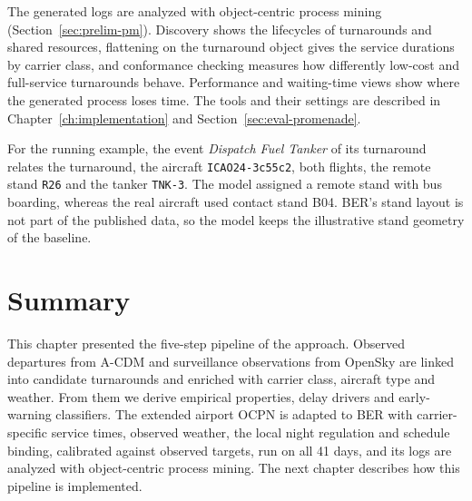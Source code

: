 The generated logs are analyzed with object-centric process mining (Section~\ref{sec:prelim-pm}). Discovery shows the lifecycles of turnarounds and shared resources, flattening on the turnaround object gives the service durations by carrier class, and conformance checking measures how differently low-cost and full-service turnarounds behave. Performance and waiting-time views show where the generated process loses time. The tools and their settings are described in Chapter~\ref{ch:implementation} and Section~\ref{sec:eval-promenade}.

For the running example, the event \emph{Dispatch Fuel Tanker} of its turnaround relates the turnaround, the aircraft \texttt{ICAO24-3c55c2}, both flights, the remote stand \texttt{R26} and the tanker \texttt{TNK-3}. The model assigned a remote stand with bus boarding, whereas the real aircraft used contact stand B04. BER's stand layout is not part of the published data, so the model keeps the illustrative stand geometry of the baseline.

\section{Summary}

This chapter presented the five-step pipeline of the approach. Observed departures from A-CDM and surveillance observations from OpenSky are linked into candidate turnarounds and enriched with carrier class, aircraft type and weather. From them we derive empirical properties, delay drivers and early-warning classifiers. The extended airport OCPN is adapted to BER with carrier-specific service times, observed weather, the local night regulation and schedule binding, calibrated against observed targets, run on all 41 days, and its logs are analyzed with object-centric process mining. The next chapter describes how this pipeline is implemented.
